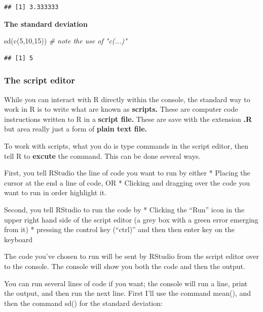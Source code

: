 \documentclass[
]{book}
\newenvironment{Shaded}{\begin{snugshade}}{\end{snugshade}}
\newcommand{\CommentTok}[1]{\textcolor[rgb]{0.56,0.35,0.01}{\textit{#1}}}
\newcommand{\DecValTok}[1]{\textcolor[rgb]{0.00,0.00,0.81}{#1}}
\newcommand{\FunctionTok}[1]{\textcolor[rgb]{0.00,0.00,0.00}{#1}}
\newcommand{\NormalTok}[1]{#1}
\begin{document}
\begin{verbatim}
## [1] 3.333333
\end{verbatim}

\textbf{The standard deviation}

\begin{Shaded}
\begin{Highlighting}[]
\FunctionTok{sd}\NormalTok{(}\FunctionTok{c}\NormalTok{(}\DecValTok{5}\NormalTok{,}\DecValTok{10}\NormalTok{,}\DecValTok{15}\NormalTok{)) }\CommentTok{\# note the use of "c(...)"}
\end{Highlighting}
\end{Shaded}

\begin{verbatim}
## [1] 5
\end{verbatim}

\hypertarget{the-script-editor}{%
\subsubsection{The script editor}\label{the-script-editor}}

While you can interact with R directly within the console, the standard way to work in R is to write what are known as \textbf{scripts.} These are computer code instructions written to R in a \textbf{script file.} These are save with the extension \textbf{.R} but area really just a form of \textbf{plain text file.}

To work with scripts, what you do is type commands in the script editor, then tell R to \textbf{excute} the command. This can be done several ways.

First, you tell RStudio the line of code you want to run by either
* Placing the cursor at the end a line of code, OR
* Clicking and dragging over the code you want to run in order highlight it.

Second, you tell RStudio to run the code by
* Clicking the ``Run'' icon in the upper right hand side of the script editor (a grey box with a green error emerging from it)
* pressing the control key (``ctrl)'' and then then enter key on the keyboard

The code you've chosen to run will be sent by RStudio from the script editor over to the console. The console will show you both the code and then the output.

You can run several lines of code if you want; the console will run a line, print the output, and then run the next line. First I'll use the command mean(), and then the command sd() for the standard deviation:
\end{document}
